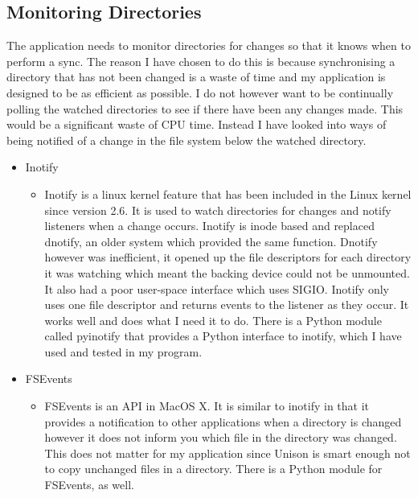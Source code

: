 \documentclass[12pt]{article}
\begin{document}
\subsection{Monitoring Directories}
The application needs to monitor directories for changes
so that it knows when to perform a sync. The reason I have
chosen to do this is because synchronising a directory that
has not been changed is a waste of time and my application
is designed to be as efficient as possible. I do not
however want to be continually polling the watched
directories to see if there have been any changes made.
This would be a significant waste of CPU time. Instead
I have looked into ways of being notified of a
change in the file system below the watched directory.
\begin{itemize}
    \item Inotify
        \begin{itemize}
        \item Inotify is a linux kernel feature that has been
        included in the Linux kernel since version 2.6.
        It is used to watch directories for changes
        and notify listeners when a change occurs. Inotify
        is inode based and replaced dnotify, an older system
        which provided the same function. Dnotify however was
        inefficient, it opened up the file descriptors for
        each directory it was watching which meant the backing
        device could not be unmounted. 
        It also had a poor
        user-space interface which uses SIGIO. Inotify only
        uses one file descriptor and returns events to the
        listener as they occur\cite{inotify-readme}. It works well and does
        what I need it to do. There is a Python module
        called pyinotify that provides a Python interface
        to inotify, which I have used and tested in my program.
        \end{itemize}

    \item FSEvents
        \begin{itemize}
        \item FSEvents is an API in MacOS X\cite{fsevents-intro}. It is similar
        to inotify in that it provides a notification to other
        applications when a directory is changed however
        it does not inform you which file in the directory
        was changed. This does not matter for my
        application since Unison is smart enough not to copy
        unchanged files in a directory. There is a Python module
        for FSEvents, as well. 
        

\end{itemize}
\end{itemize}
\end{document}
